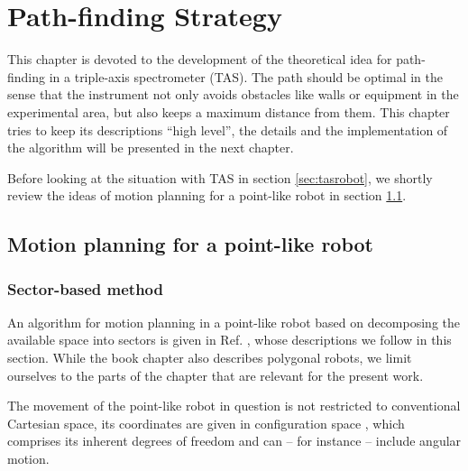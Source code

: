 %
%

\chapter{Path-finding Strategy}
\label{ch:paths}

This chapter is devoted to the development of the theoretical idea for path-finding in a triple-axis spectrometer (TAS). The path should be optimal in the sense that the instrument not only avoids obstacles like walls or equipment in the experimental area, but also keeps a maximum distance from them. This chapter tries to keep its descriptions ``high level'', the details
and the implementation of the algorithm will be presented in the next chapter.

Before looking at the situation with TAS in section \ref{sec:tasrobot}, we shortly review the ideas of motion planning for a 
point-like robot in section \ref{sec:pointrobot}.



\section{Motion planning for a point-like robot}
\label{sec:pointrobot}

\subsection*{Sector-based method}
An algorithm for motion planning in a point-like robot based on decomposing the available space into sectors is 
given in Ref. \cite[Ch. 13, pp. 283-306]{Berg2008}, whose descriptions we follow in this section. 
While the book chapter also describes polygonal robots, we limit ourselves to the parts of the chapter 
that are relevant for the present work.

The movement of the point-like robot in question is not restricted to conventional Cartesian space, its coordinates are given in configuration
space  \cite[Ch. 13.1, pp. 284-286]{Berg2008}, which comprises its inherent degrees of freedom and can -- for instance -- include angular motion.

